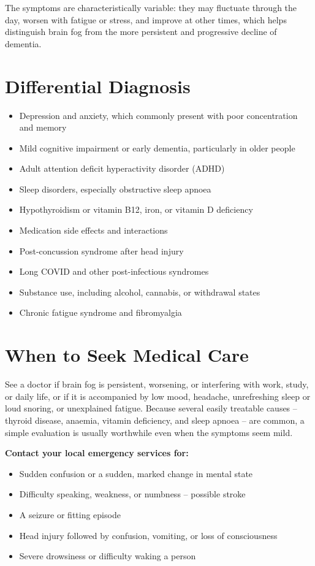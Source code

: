 The symptoms are characteristically variable: they may fluctuate through the day, worsen with fatigue or stress, and improve at other times, which helps distinguish brain fog from the more persistent and progressive decline of dementia.

\section*{Differential Diagnosis}
\begin{itemize}
    \item Depression and anxiety, which commonly present with poor concentration and memory
    \item Mild cognitive impairment or early dementia, particularly in older people
    \item Adult attention deficit hyperactivity disorder (ADHD)
    \item Sleep disorders, especially obstructive sleep apnoea
    \item Hypothyroidism or vitamin B12, iron, or vitamin D deficiency
    \item Medication side effects and interactions
    \item Post-concussion syndrome after head injury
    \item Long COVID and other post-infectious syndromes
    \item Substance use, including alcohol, cannabis, or withdrawal states
    \item Chronic fatigue syndrome and fibromyalgia
\end{itemize}

\section*{When to Seek Medical Care}
See a doctor if brain fog is persistent, worsening, or interfering with work, study, or daily life, or if it is accompanied by low mood, headache, unrefreshing sleep or loud snoring, or unexplained fatigue. Because several easily treatable causes -- thyroid disease, anaemia, vitamin deficiency, and sleep apnoea -- are common, a simple evaluation is usually worthwhile even when the symptoms seem mild.

\textbf{Contact your local emergency services for:}
\begin{itemize}
    \item Sudden confusion or a sudden, marked change in mental state
    \item Difficulty speaking, weakness, or numbness -- possible stroke
    \item A seizure or fitting episode
    \item Head injury followed by confusion, vomiting, or loss of consciousness
    \item Severe drowsiness or difficulty waking a person
\end{itemize}

